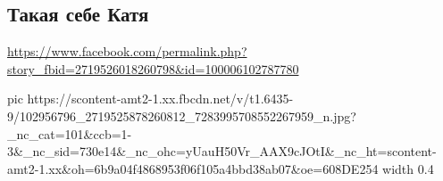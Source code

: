  
 
 
 
 

\subsection{Такая себе Катя}
\url{https://www.facebook.com/permalink.php?story_fbid=2719526018260798&id=100006102787780}


\ifcmt
  pic https://scontent-amt2-1.xx.fbcdn.net/v/t1.6435-9/102956796_2719525878260812_7283995708552267959_n.jpg?_nc_cat=101&ccb=1-3&_nc_sid=730e14&_nc_ohc=yUauH50Vr_AAX9cJOtI&_nc_ht=scontent-amt2-1.xx&oh=6b9a04f4868953f06f105a4bbd38ab07&oe=608DE254
  width 0.4
\fi

